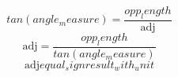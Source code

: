 \[tan({angle_measure})=\frac{{{opp_length}}}{{\text{{{adj}}}}}\]
\[\text{{{adj}}}=\frac{{{opp_length}}}{{tan({angle_measure})}}\]
\[\text{{{adj}}}{equal_sign}{result_with_unit}\]
